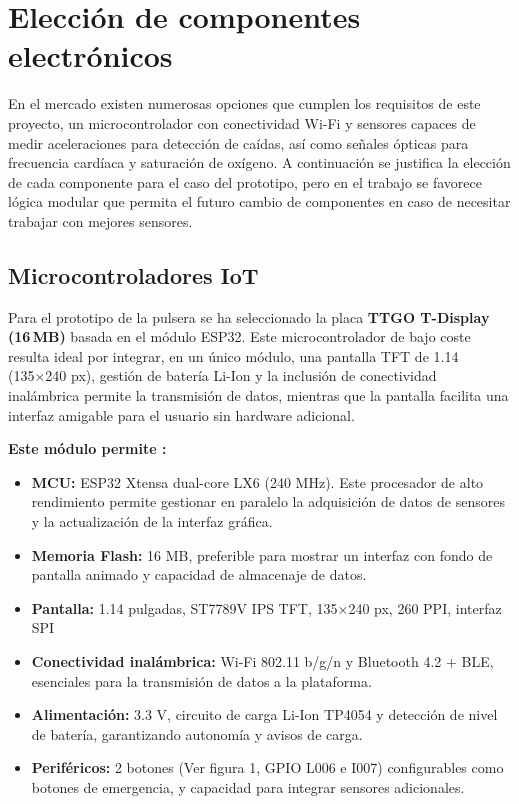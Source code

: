 \documentclass[12pt, a4paper]{article}
\begin{document}
	\section{Elección de componentes electrónicos}
	
	
	En el mercado existen numerosas opciones que cumplen los requisitos de este proyecto, un microcontrolador con conectividad Wi-Fi y sensores capaces de medir aceleraciones para detección de caídas, así como señales ópticas para frecuencia cardíaca y saturación de oxígeno. A continuación se justifica la elección de cada componente para el caso del prototipo, pero en el trabajo se favorece lógica modular que permita el futuro cambio de componentes en caso de necesitar trabajar con mejores sensores.
	
	\subsection{Microcontroladores IoT}
	
	Para el prototipo de la pulsera se ha seleccionado la placa \textbf{TTGO T-Display (16\,MB)} basada en el módulo ESP32. Este microcontrolador de bajo coste resulta ideal por integrar, en un único módulo, una pantalla TFT de 1.14\,\textquotedbl{} (135×240 px), gestión de batería Li-Ion y la inclusión de conectividad inalámbrica permite la transmisión de datos, mientras que la pantalla facilita una interfaz amigable para el usuario sin hardware adicional\cite{TTGO2021}.
	
	\noindent\textbf{Este módulo permite \cite{TTGO2021}:}
	\begin{itemize}
		\item \textbf{MCU:} ESP32 Xtensa dual-core LX6 (240 MHz). Este procesador de alto rendimiento permite gestionar en paralelo la adquisición de datos de sensores y la actualización de la interfaz gráfica.
		\item \textbf{Memoria Flash:} 16 MB, preferible para mostrar un interfaz con fondo de pantalla animado y capacidad de almacenaje de datos.
		\item \textbf{Pantalla:} 1.14 pulgadas, ST7789V IPS TFT, 135×240 px, 260 PPI, interfaz SPI
		\item \textbf{Conectividad inalámbrica:} Wi-Fi 802.11 b/g/n y Bluetooth 4.2 + BLE, esenciales para la transmisión de datos a la plataforma.
		\item \textbf{Alimentación:} 3.3 V, circuito de carga Li-Ion TP4054 y detección de nivel de batería, garantizando autonomía y avisos de carga.
		\item \textbf{Periféricos:} 2 botones (Ver figura 1, GPIO L006 e I007) configurables como botones de emergencia, y capacidad para integrar sensores adicionales.
	\end{itemize}
		
\end{document}
